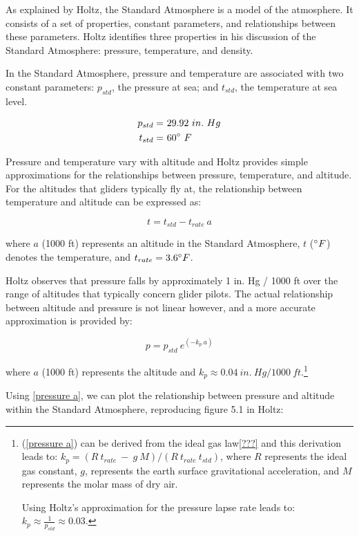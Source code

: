 \documentclass[10pt,a4paper]{article}
\begin{document}
As explained by Holtz, the Standard Atmosphere is a model of the atmosphere. It consists of a set of properties, constant parameters, and relationships between these parameters. Holtz identifies three properties in his discussion of the Standard Atmosphere: pressure, temperature, and density.

In the Standard Atmosphere, pressure and temperature are associated with two constant parameters: $p_{std}$, the pressure at sea; and $t_{std}$, the temperature at sea level.

\begin{align*}
  p_{std} =&\ 29.92\ in.\ Hg\\
  t_{std} =&\ 60\degree\ F
\end{align*}

Pressure and temperature vary with altitude and Holtz provides simple approximations for the relationships between pressure, temperature, and altitude. For the altitudes that gliders typically fly at, the relationship between temperature and altitude can be expressed as:

\begin{equation}
t = t_{std} - t_{rate}\ a
\end{equation}

where $a$ (1000 ft) represents an altitude in the Standard Atmosphere, $t$ ($\degree F$) denotes the temperature, and $t_{rate} = 3.6\degree F$.

Holtz observes that pressure falls by approximately 1 in. Hg / 1000 ft over the range of altitudes that typically concern glider pilots. The actual relationship between altitude and pressure is not linear however, and a more accurate approximation is provided by:

\begin{equation}\label{pressure a}
p = p_{std}\ e^{(- k_{p}\ a)}
\end{equation}

where $a$ (1000 ft) represents the altitude and $k_{p} \approx 0.04\ in.\ Hg/1000\ ft$.\footnote{(\ref{pressure a}) can be derived from the ideal gas law\ref{???} and this derivation leads to: $k_{p} = (R\ t_{rate}\ -\ g\ M)/(R\ t_{rate}\ t_{std})$, where $R$ represents the ideal gas constant, $g$, represents the earth surface gravitational acceleration, and $M$ represents the molar mass of dry air.

Using Holtz's approximation for the pressure lapse rate leads to: $k_{p} \approx \frac{1}{p_{std}} \approx 0.03.$}

Using \ref{pressure a}, we can plot the relationship between pressure and altitude within the Standard Atmosphere, reproducing figure 5.1 in Holtz:
\end{document}

